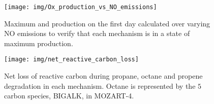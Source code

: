 %
\begin{figure}[h!]
    \begin{center}
        \texttt{[image: img/Ox\_production\_vs\_NO\_emissions]}
        \caption{Maximum  and  production on the first day calculated over varying NO emissions to verify that each mechanism is in a state of maximum  production.}
    \end{center}
\end{figure} 
%
\begin{figure}
    \begin{center}
        \texttt{[image: img/net\_reactive\_carbon\_loss]}
        \caption{Net loss of reactive carbon during propane, octane and propene degradation in each mechanism. Octane is represented by the $5$ carbon species, BIGALK, in MOZART-4.}
    \end{center}
\end{figure} 
